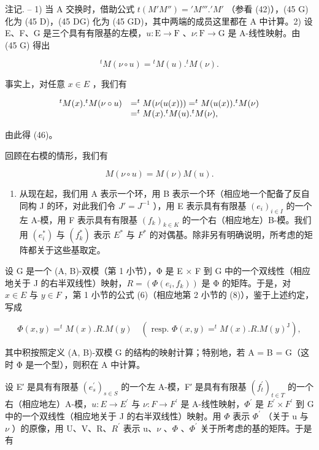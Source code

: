 注记. -- 1) 当 A 交换时，借助公式 \(t(M'M'') = 'M'''.'M'\) （参看 (42)），(45 G) 化为 (45 D)，(45 DG) 化为 (45 GD)，其中两端的成员这里都在 A 中计算。2) 设 E、F、G 是三个具有有限基的左模，\(u: \mathrm{E} \to \mathrm{F}\) 、\(\nu: \mathrm{F} \to \mathrm{G}\) 是 A-线性映射。由 (45 G) 得出

\[
{ } ^ { t } M ( \nu \circ u ) = { } ^ { t } M ( u ) . { } ^ { t } M ( \nu ) .\tag{46}
\]

事实上，对任意 \(x \in E\) ，我们有

\[
\begin{array}{r l} ^ {t} M (x). ^ {t} M (\nu \circ u) & = ^ {t} M (\nu (u (x))) = ^ {t} M (u (x)). ^ {t} M (\nu) \\ & = ^ {t} M (x). ^ {t} M (u). ^ {t} M (\nu), \end{array}
\]

由此得 (46)。

回顾在右模的情形，我们有

\[
M (\nu \circ u) = M (\nu) M (u).
\]

\begin{enumerate}
\def\labelenumi{\Roman{enumi}.}
\setcounter{enumi}{2}
\tightlist
\item
  从现在起，我们用 A 表示一个环，用 B 表示一个环（相应地一个配备了反自同构 J 的环，对此我们令 \(J' = J^{-1}\) ），用 E 表示具有有限基 \((e_i)_{i \in I}\) 的一个左 A-模，用 F 表示具有有限基 \((f_k)_{k \in K}\) 的一个右（相应地左）B-模。我们用 \((e_i^*)\) 与 \((f_k^*)\) 表示 \(E^*\) 与 \(F^*\) 的对偶基。除非另有明确说明，所考虑的矩阵都关于这些基取定。
\end{enumerate}

设 G 是一个 (A, B)-双模（第 1 小节），Φ 是 E × F 到 G 中的一个双线性（相应地关于 J 的右半双线性）映射，\(R = (\Phi(e_i, f_k))\) 是 Φ 的矩阵。于是，对 \(x \in E\) 与 \(y \in F\) ，第 1 小节的公式 (6)（相应地第 2 小节的 (8)），鉴于上述约定，写成

\[
\Phi (x, y) = ^ {t} M (x). R. M (y) \quad (\text { resp. } \Phi (x, y) = ^ {t} M (x). R. M (y) ^ {\mathrm{J}}),\tag{47}
\]

其中积按照定义 (A, B)-双模 G 的结构的映射计算；特别地，若 A = B = G（这时 Φ 是一个型），则积在 A 中计算。

设 E′ 是具有有限基 \((e_{s}^{\prime})_{s\in S}\) 的一个左 A-模，F′ 是具有有限基 \((f_{t}^{\prime})_{t\in T}\) 的一个右（相应地左）A-模，\(u:E\to E^{\prime}\) 与 \(\nu:F\to F^{\prime}\) 是 A-线性映射，\(\Phi^{\prime}\) 是 \(E^{\prime}\times F^{\prime}\) 到 G 中的一个双线性（相应地关于 J 的右半双线性）映射。用 \(\Phi\) 表示 \(\Phi^{\prime}\) （关于 u 与 \(\nu\) ）的原像，用 U、V、R、\(R^{\prime}\) 表示 u、\(\nu\) 、\(\Phi\) 、\(\Phi^{\prime}\) 关于所考虑的基的矩阵。于是有

